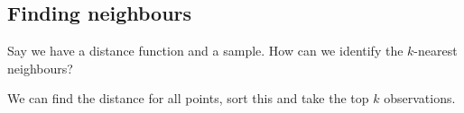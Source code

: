 
\subsection{Finding neighbours}

Say we have a distance function and a sample. How can we identify the \(k\)-nearest neighbours?

We can find the distance for all points, sort this and take the top \(k\) observations.
